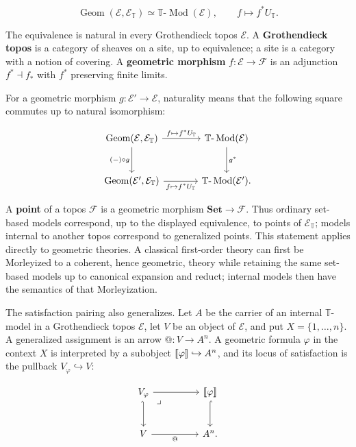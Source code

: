 \documentclass[11pt]{article}
\makeatletter
\newcommand{\llbracket}{\mathopen{[\mkern-3mu[}}
\newcommand{\rrbracket}{\mathclose{]\mkern-3mu]}}
\newcommand{\atsign}{\mathord{@}}
\theoremstyle{definition}
\makeatother
\begin{document}
\[
\operatorname{Geom}(\mathcal E,\mathcal E_{\mathbb T})
\simeq
\mathbb T\text{-}\operatorname{Mod}(\mathcal E),
\qquad f\longmapsto f^*U_{\mathbb T}.
\]

The equivalence is natural in every Grothendieck topos \(\mathcal E\). A
\textbf{Grothendieck topos} is a category of sheaves on a site, up to
equivalence; a site is a category with a notion of covering. A
\textbf{geometric morphism} \(f:\mathcal E\to\mathcal F\) is an adjunction
\(f^*\dashv f_*\) with \(f^*\) preserving finite limits.

For a geometric morphism
\(g:\mathcal E'\to\mathcal E\), naturality means that the following square
commutes up to natural isomorphism:

\[
\begin{tikzcd}[row sep=large,column sep=large]
\operatorname{Geom}(\mathcal E,\mathcal E_{\mathbb T})
  \arrow[r,"f\mapsto f^*U_{\mathbb T}"]
  \arrow[d,"(-)\circ g"'] &
\mathbb T\text{-}\operatorname{Mod}(\mathcal E)
  \arrow[d,"g^*"] \\
\operatorname{Geom}(\mathcal E',\mathcal E_{\mathbb T})
  \arrow[r,"f\mapsto f^*U_{\mathbb T}"'] &
\mathbb T\text{-}\operatorname{Mod}(\mathcal E').
\end{tikzcd}
\]

A \textbf{point} of
a topos \(\mathcal F\) is a geometric morphism
\(\mathbf{Set}\to\mathcal F\). Thus ordinary set-based models correspond,
up to the displayed equivalence, to points of \(\mathcal E_{\mathbb T}\);
models internal to another topos correspond to generalized points. This
statement applies directly to geometric theories. A classical first-order
theory can first be Morleyized to a coherent, hence geometric, theory while
retaining the same set-based models up to canonical expansion and reduct;
internal models then have the semantics of that Morleyization.

The satisfaction pairing also generalizes. Let \(A\) be the carrier of an
internal \(\mathbb T\)-model in a Grothendieck topos \(\mathcal E\), let
\(V\) be an object of \(\mathcal E\), and put \(X=\{1,\ldots,n\}\). A
generalized assignment is an arrow \(\atsign:V\to A^n\). A geometric formula
\(\varphi\) in the context \(X\) is interpreted by a subobject
\(\llbracket\varphi\rrbracket\hookrightarrow A^n\), and its locus of
satisfaction is the pullback \(V_\varphi\hookrightarrow V\):

\[
\begin{tikzcd}[row sep=large,column sep=huge]
V_\varphi \arrow[r] \arrow[d,hook']
  \arrow[dr,phantom,"\lrcorner",very near start] &
\llbracket\varphi\rrbracket \arrow[d,hook] \\
V \arrow[r,"\atsign"'] & A^n .
\end{tikzcd}
\]
\end{document}
